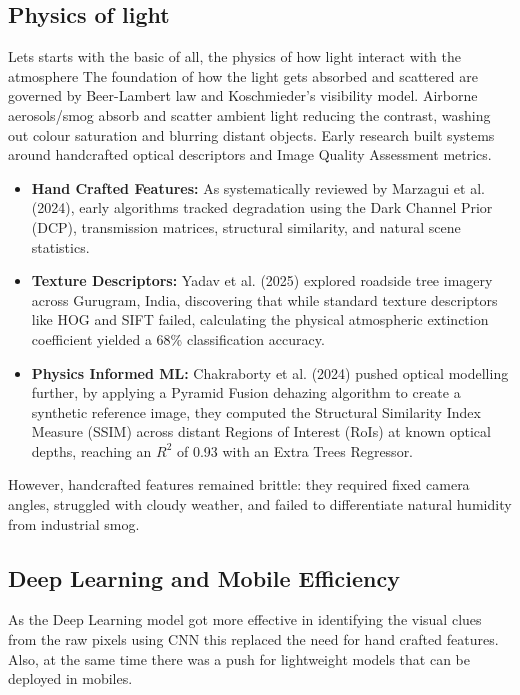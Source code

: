 \documentclass[conference]{IEEEtran}
\begin{document}
\subsection{Physics of light}

Lets starts with the basic of all, the physics of how light interact with the
atmosphere The foundation of how the light gets absorbed and scattered are
governed by Beer-Lambert law and Koschmieder's visibility model. Airborne
aerosols/smog absorb and scatter ambient light reducing the contrast, washing
out colour saturation and blurring distant objects. Early research built systems
around handcrafted optical descriptors and Image Quality Assessment metrics.

\begin{itemize}
  \item \textbf{Hand Crafted Features:} As systematically reviewed by Marzagui
        et al. (2024)\cite{marzaguiReviewImageQuality2024}, early algorithms
        tracked degradation using the Dark Channel Prior (DCP), transmission
        matrices, structural similarity, and natural scene statistics.
  \item \textbf{Texture Descriptors:} Yadav et al.
        (2025)\cite{yadavRoadsideTreeImageBased2025} explored roadside tree
        imagery across Gurugram, India, discovering that while standard texture
        descriptors like HOG and SIFT failed, calculating the physical
        atmospheric extinction coefficient yielded a 68\% classification
        accuracy.
  \item \textbf{Physics Informed ML:} Chakraborty et al.
        (2024)\cite{chakrabortyCanImageTell2024} pushed optical modelling
        further, by applying a Pyramid Fusion dehazing algorithm to create a
        synthetic reference image, they computed the Structural Similarity Index
        Measure (SSIM) across distant Regions of Interest (RoIs) at known
        optical depths, reaching an $R^2$ of 0.93 with an Extra Trees Regressor.
\end{itemize}

However, handcrafted features remained brittle: they required fixed camera
angles, struggled with cloudy weather, and failed to differentiate natural
humidity from industrial smog.

\subsection{Deep Learning and Mobile Efficiency}

As the Deep Learning model got more effective in identifying the visual clues
from the raw pixels using CNN this replaced the need for hand crafted features.
Also, at the same time there was a push for lightweight models that can be
deployed in mobiles.
\end{document}
